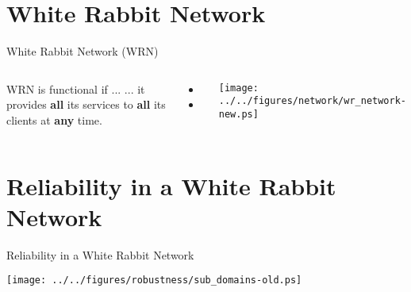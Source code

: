 \documentclass[compress, red]{beamer}
\begin{document}
\section{White Rabbit Network}
\begin{frame}{White Rabbit Network (WRN)}


\begin{columns}[c]

    \begin{block}{WRN is functional if ...}
    ... it provides {\bf all} its services to {\bf all} its clients at {\bf any} time.
    \end{block}

  \vspace{0.2cm}

  \begin{itemize}
    \item \color{blue!90}{Sub-nanosecond time synchronization}
    \item \color{red}{Deterministic Control Data delivery}
  \end{itemize}

    \begin{center}
    \texttt{[image: ../../figures/network/wr\_network-new.ps]}
    \end{center}
\end{columns}
  

\end{frame}
\section{Reliability in a White Rabbit Network}
\begin{frame}{Reliability in a White Rabbit Network}


    \begin{center}
    \texttt{[image: ../../figures/robustness/sub\_domains-old.ps]}
    \end{center}

  

\end{frame}
\end{document}
